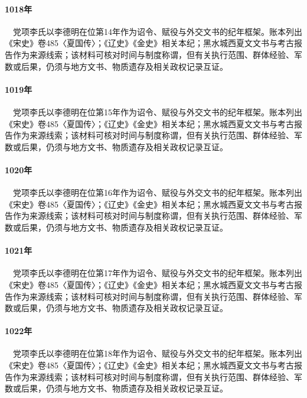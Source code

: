 \paragraph{1018年}　党项李氏以李德明在位第14年作为诏令、赋役与外交文书的纪年框架。账本列出《宋史》卷485〈夏国传〉；《辽史》《金史》相关本纪；黑水城西夏文文书与考古报告作为来源线索；该材料可核对时间与制度称谓，但有关执行范围、群体经验、军数或后果，仍须与地方文书、物质遗存及相关政权记录互证。

\paragraph{1019年}　党项李氏以李德明在位第15年作为诏令、赋役与外交文书的纪年框架。账本列出《宋史》卷485〈夏国传〉；《辽史》《金史》相关本纪；黑水城西夏文文书与考古报告作为来源线索；该材料可核对时间与制度称谓，但有关执行范围、群体经验、军数或后果，仍须与地方文书、物质遗存及相关政权记录互证。

\paragraph{1020年}　党项李氏以李德明在位第16年作为诏令、赋役与外交文书的纪年框架。账本列出《宋史》卷485〈夏国传〉；《辽史》《金史》相关本纪；黑水城西夏文文书与考古报告作为来源线索；该材料可核对时间与制度称谓，但有关执行范围、群体经验、军数或后果，仍须与地方文书、物质遗存及相关政权记录互证。

\paragraph{1021年}　党项李氏以李德明在位第17年作为诏令、赋役与外交文书的纪年框架。账本列出《宋史》卷485〈夏国传〉；《辽史》《金史》相关本纪；黑水城西夏文文书与考古报告作为来源线索；该材料可核对时间与制度称谓，但有关执行范围、群体经验、军数或后果，仍须与地方文书、物质遗存及相关政权记录互证。

\paragraph{1022年}　党项李氏以李德明在位第18年作为诏令、赋役与外交文书的纪年框架。账本列出《宋史》卷485〈夏国传〉；《辽史》《金史》相关本纪；黑水城西夏文文书与考古报告作为来源线索；该材料可核对时间与制度称谓，但有关执行范围、群体经验、军数或后果，仍须与地方文书、物质遗存及相关政权记录互证。

